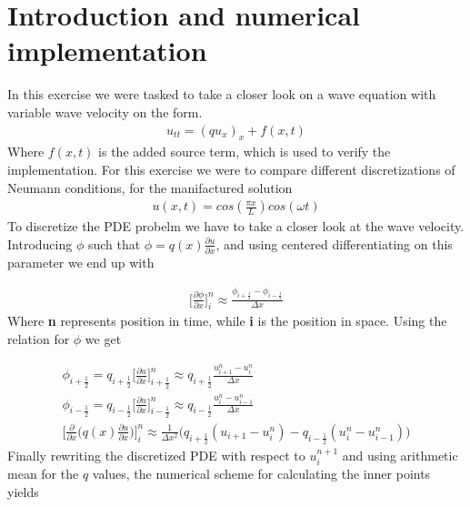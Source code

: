 \documentclass[a4paper,norsk]{article}
\begin{document}
\maketitle
\section*{Introduction and numerical implementation}
In this exercise we were tasked to take a closer look on a wave equation with variable wave velocity on the form.
\begin{align*}
u_{tt} = (qu_x)_x + f(x,t)
\end{align*}
Where $f(x,t)$ is the added source term, which is used to verify the implementation. For this exercise we were to compare different discretizations of Neumann conditions, for the manifactured solution 
\begin{align*}
u(x,t) = cos(\frac{\pi x}{L})cos(\omega t)
\end{align*}
To discretize the PDE probelm we have to take a closer look at the wave velocity. Introducing $\phi$ such that $\phi = q(x) \frac{\partial u}{\partial x} $, and using centered differentiating on this parameter we end up with

\begin{align*}
\big[\frac{\partial \phi}{\partial x} \big]_i^n \approx \frac{\phi_{i+\frac{1}{2}}-\phi_{i-\frac{1}{2}}}{\Delta x}
\end{align*}
Where \textbf{n} represents position in time, while \textbf{i} is the position in space. Using the relation for $\phi$ we get

\begin{align*}
\phi_{i + \frac{1}{2}} = q_{i+\frac{1}{2}} \Big[\frac{\partial u}{\partial x} \Big]_{i+\frac{1}{2}}^n \approx
q_{i+\frac{1}{2}} \frac{u_{i+1}^n-u_i^n}{\Delta x} \\
\phi_{i - \frac{1}{2}} = q_{i-\frac{1}{2}} \Big[\frac{\partial u}{\partial x} \Big]_{i-\frac{1}{2}}^n \approx
q_{i-\frac{1}{2}} \frac{u_{i}^n-u_{i-1}^n}{\Delta x} \\
\Big[\frac{\partial}{\partial x} \big(q(x)\frac{\partial u}{\partial x} \big) \Big]_i^n \approx
\frac{1}{\Delta x^2} \Big( q_{i+\frac{1}{2}}(u_{i+1}-u_i^n) - q_{i-\frac{1}{2}}(u_i^n-u_{i-1}^n)  \Big) 
\end{align*}
Finally rewriting the discretized PDE with respect to $u_i^{n+1}$ and using arithmetic mean for the $q$ values, the numerical scheme for calculating the inner points yields
\end{document}
